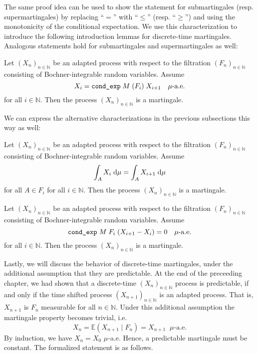 The same proof idea can be used to show the statement for submartingales (resp. supermartingales) by replacing ``$=$'' with ``$\le$'' (resp. ``$\ge$'') and using the monotonicity of the conditional expectation. We use this characterization to introduce the following introduction lemmas for discrete-time martingales. Analogous statements hold for submartingales and supermartingales as well:

\begin{lemma}
  Let $(X_n)_{n \in \mathbb{N}}$ be an adapted process with respect to the filtration $(F_n)_{n \in \mathbb{N}}$ consisting of Bochner-integrable random variables. Assume 
  \[
  \normalfont X_i = \texttt{cond\_exp} \; M \; (F_i) \; X_{i+1} \quad\mu\textrm{-a.e.} 
  \]
  for all $i \in \mathbb{N}$. Then the process $(X_n)_{n \in \mathbb{N}}$ is a martingale.
\end{lemma}

We can express the alternative characterizations in the previous subsections this way as well:

\begin{lemma}
  Let $(X_n)_{n \in \mathbb{N}}$ be an adapted process with respect to the filtration $(F_n)_{n \in \mathbb{N}}$ consisting of Bochner-integrable random variables. 
  Assume 
  \[
  \normalfont \int_A X_i \;\textrm{d}\mu = \int_A X_{i+1} \;\textrm{d}\mu
  \] 
  for all $A \in F_i$ for all $i \in \mathbb{N}$. Then the process $(X_n)_{n \in \mathbb{N}}$ is a martingale.
\end{lemma}

\begin{lemma}
  Let $(X_n)_{n \in \mathbb{N}}$ be an adapted process with respect to the filtration $(F_n)_{n \in \mathbb{N}}$ consisting of Bochner-integrable random variables. Assume 
  \[
  \normalfont \texttt{cond\_exp} \; M \; F_i \; (X_{i+1} - X_i) = 0 \quad\mu\textrm{-a.e.}
  \] 
  for all $i \in \mathbb{N}$. Then the process $(X_n)_{n \in \mathbb{N}}$ is a martingale.
\end{lemma}

Lastly, we will discuss the behavior of discrete-time martingales, under the additional assumption that they are predictable. At the end of the preceeding chapter, we had shown that a discrete-time $(X_n)_{n \in \mathbb{N}}$ process is predictable, if and only if the time shifted process $(X_{n + 1})_{n \in \mathbb{N}}$ is an adapted process. That is, $X_{n+1}$ is $F_n$ measurable for all $n \in \mathbb{N}$. Under this additional assumption the martingale property becomes trivial, i.e.
\[
	X_n = \mathbb{E}(X_{n+1} \;\vert\; F_n) = X_{n+1} \;\;\mu\textrm{-a.e.}
\]
By induction, we have $X_n = X_0$ $\mu$-a.e. Hence, a predictable martingale must be constant. The formalized statement is as follows.

